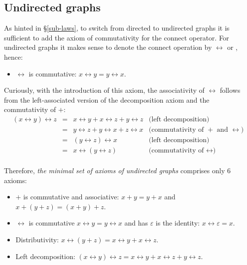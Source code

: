 \subsection{Undirected graphs}

As hinted in \S\ref{sub-laws}, to switch from directed to undirected graphs it
is sufficient to add the axiom of commutativity for the connect operator. For
undirected graphs it makes sense to denote the connect operation by $\leftrightarrow$ or
\textemdash, hence:

\begin{itemize}
    \item $\leftrightarrow$ is commutative: $x \leftrightarrow y = y \leftrightarrow x$.
\end{itemize}

Curiously, with the introduction of this axiom, the associativity of $\leftrightarrow$
follows from the left-associated version of the decomposition axiom and the
commutativity of $+$:
\[
\begin{array}{rcll}
(x \leftrightarrow y) \leftrightarrow z & = & x \leftrightarrow y + x \leftrightarrow z + y \leftrightarrow z & \text{(left decomposition)}\\
 & = & y \leftrightarrow z + y \leftrightarrow x + z \leftrightarrow x & \text{(commutativity of $+$ and $\leftrightarrow$)}\\
 & = &  (y \leftrightarrow z) \leftrightarrow x & \text{(left decomposition)}\\
 & = &   x \leftrightarrow (y \leftrightarrow z) & \text{(commutativity of $\leftrightarrow$)}\\
\end{array}
\]

Therefore, \emph{the minimal set of axioms of undirected graphs} comprises only 6 axioms:

\begin{itemize}
    \item $+$ is commutative and associative: $x + y = y + x$ and
    $x + (y + z) = (x + y) + z$.
    \item $\leftrightarrow$ is commutative $x \leftrightarrow y = y \leftrightarrow x$ and
    has $\varepsilon$ is the identity: $x \leftrightarrow \varepsilon = x$.
    \item Distributivity:
    $x \leftrightarrow (y + z) = x \leftrightarrow y + x \leftrightarrow z$.
    \item Left decomposition: $(x \leftrightarrow y) \leftrightarrow z =
    x \leftrightarrow y + x \leftrightarrow z + y \leftrightarrow z$.
\end{itemize}

